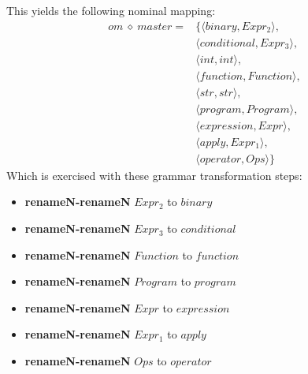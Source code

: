 This yields the following nominal mapping:
\begin{align*}\mathit{om} \:\diamond\: \mathit{master} =& \{\langle \mathit{binary},\mathit{Expr_2}\rangle,\\
 & \langle \mathit{conditional},\mathit{Expr_3}\rangle,\\
 & \langle int,int\rangle,\\
 & \langle \mathit{function},\mathit{Function}\rangle,\\
 & \langle str,str\rangle,\\
 & \langle \mathit{program},\mathit{Program}\rangle,\\
 & \langle \mathit{expression},\mathit{Expr}\rangle,\\
 & \langle \mathit{apply},\mathit{Expr_1}\rangle,\\
 & \langle \mathit{operator},\mathit{Ops}\rangle\}\end{align*}
 Which is exercised with these grammar transformation steps:

{\footnotesize\begin{itemize}
\item \textbf{renameN-renameN} $\mathit{Expr_2}$ to $\mathit{binary}$
\item \textbf{renameN-renameN} $\mathit{Expr_3}$ to $\mathit{conditional}$
\item \textbf{renameN-renameN} $\mathit{Function}$ to $\mathit{function}$
\item \textbf{renameN-renameN} $\mathit{Program}$ to $\mathit{program}$
\item \textbf{renameN-renameN} $\mathit{Expr}$ to $\mathit{expression}$
\item \textbf{renameN-renameN} $\mathit{Expr_1}$ to $\mathit{apply}$
\item \textbf{renameN-renameN} $\mathit{Ops}$ to $\mathit{operator}$
\end{itemize}}

